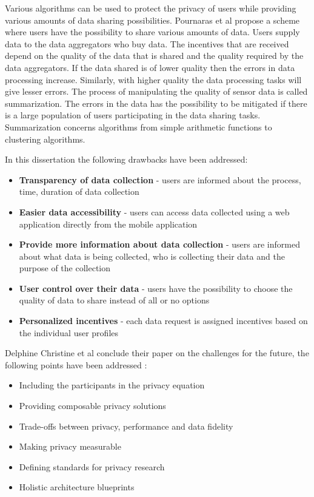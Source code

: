 Various algorithms can be used to protect the privacy of users while providing various amounts of data sharing possibilities. Pournaras et al \cite{pournaras2016self} propose a scheme where users have the possibility to share various amounts of data. Users supply data to the data aggregators who buy data. The incentives that are received depend on the quality of the data that is shared and the quality required by the data aggregators. If the data shared is of lower quality then the errors in data processing increase. Similarly, with higher quality the data processing tasks will give lesser errors. The process of manipulating the quality of sensor data is called summarization. The errors in the data has the possibility to be mitigated if there is a large population of users participating in the data sharing tasks. Summarization concerns algorithms from simple arithmetic functions to clustering algorithms.

In this dissertation the following drawbacks have been addressed:
\begin{itemize}
\item \textbf{Transparency of data collection} - users are informed about the process, time, duration of data collection
\item \textbf{Easier data accessibility} -  users can access data collected using a web application directly from the mobile application
\item \textbf{Provide more information about data collection} - users are informed about what data is being collected, who is collecting their data and the purpose of the collection
\item \textbf{User control over their data} - users have the possibility to choose the quality of data to share instead of all or no options 
\item \textbf{Personalized incentives} - each data request is assigned incentives based on the individual user profiles
\end{itemize}

Delphine Christine et al \cite{christin2016privacy} conclude their paper on the challenges for the future, the following points have been addressed \cite{pournarasethical}:

\begin{itemize}
\item Including the participants in the privacy equation
\item Providing composable privacy solutions
\item Trade-offs between privacy, performance and data fidelity
\item Making privacy measurable
\item Defining standards for privacy research
\item Holistic architecture blueprints
\end{itemize}



